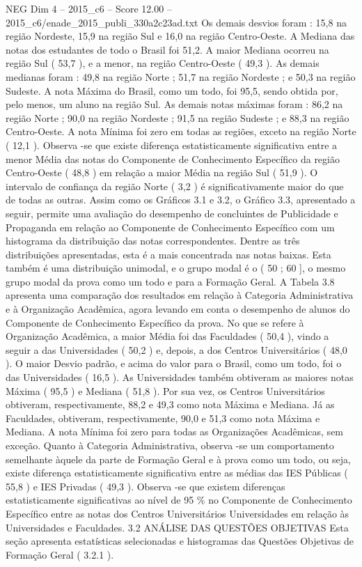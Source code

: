 \begin{textsample}{NEG Dim 4 – 2015\_c6 – Score 12.00 – 2015\_c6/enade\_2015\_publi\_330a2c23ad.txt}
Os demais desvios foram : 15,8 na região Nordeste, 15,9 na região Sul e 16,0 na região Centro-Oeste.
A Mediana das notas dos estudantes de todo o Brasil foi 51,2.
A maior Mediana ocorreu na região Sul ( 53,7 ), e a menor, na região Centro-Oeste ( 49,3 ).
As demais medianas foram : 49,8 na região Norte ; 51,7 na região Nordeste ; e 50,3 na região Sudeste.
A nota Máxima do Brasil, como um todo, foi 95,5, sendo obtida por, pelo menos, um aluno na região Sul.
As demais notas máximas foram : 86,2 na região Norte ; 90,0 na região Nordeste ; 91,5 na região Sudeste ; e 88,3 na região Centro-Oeste.
A nota Mínima foi zero em todas as regiões, exceto na região Norte ( 12,1 ).
Observa -se que existe diferença estatisticamente significativa entre a menor Média das notas do Componente de Conhecimento Específico da região Centro-Oeste ( 48,8 ) em relação a maior Média na região Sul ( 51,9 ).
O intervalo de confiança da região Norte ( 3,2 ) é significativamente maior do que de todas as outras.
Assim como os Gráficos 3.1 e 3.2, o Gráfico 3.3, apresentado a seguir, permite uma avaliação do desempenho de concluintes de Publicidade e Propaganda em relação ao Componente de Conhecimento Específico com um histograma da distribuição das notas correspondentes.
Dentre as três distribuições apresentadas, esta é a mais concentrada nas notas baixas.
Esta também é uma distribuição unimodal, e o grupo modal é o ( 50 ; 60 ], o mesmo grupo modal da prova como um todo e para a Formação Geral.
A Tabela 3.8 apresenta uma comparação dos resultados em relação à Categoria Administrativa e à Organização Acadêmica, agora levando em conta o desempenho de alunos do Componente de Conhecimento Específico da prova.
No que se refere à Organização Acadêmica, a maior Média foi das Faculdades ( 50,4 ), vindo a seguir a das Universidades ( 50,2 ) e, depois, a dos Centros Universitários ( 48,0 ).
O maior Desvio padrão, e acima do valor para o Brasil, como um todo, foi o das Universidades ( 16,5 ).
As Universidades também obtiveram as maiores notas Máxima ( 95,5 ) e Mediana ( 51,8 ).
Por sua vez, os Centros Universitários obtiveram, respectivamente, 88,2 e 49,3 como nota Máxima e Mediana.
Já as Faculdades, obtiveram, respectivamente, 90,0 e 51,3 como nota Máxima e Mediana.
A nota Mínima foi zero para todas as Organizações Acadêmicas, sem exceção.
Quanto à Categoria Administrativa, observa -se um comportamento semelhante àquele da parte de Formação Geral e à prova como um todo, ou seja, existe diferença estatisticamente significativa entre as médias das IES Públicas ( 55,8 ) e IES Privadas ( 49,3 ).
Observa -se que existem diferenças estatisticamente significativas ao nível de 95 \% no Componente de Conhecimento Específico entre as notas dos Centros Universitários Universidades em relação às Universidades e Faculdades. 3.2 ANÁLISE DAS QUESTÕES OBJETIVAS Esta seção apresenta estatísticas selecionadas e histogramas das Questões Objetivas de Formação Geral ( 3.2.1 ).

\end{textsample}
